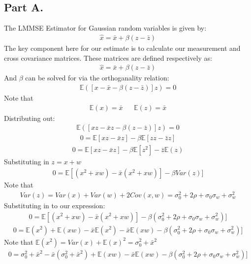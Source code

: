 \documentclass{article}
\begin{document}
\subsection*{Part A.}
The LMMSE Estimator for Gaussian random variables is given by:
\begin{align*}
\hat{x} = \bar{x} + \beta (z-\bar{z})
\end{align*}
The key component here for our estimate is to calculate our measurement and cross covariance matrices. These matrices are defined respectively as:
\begin{align*}
\hat{x} = \bar{x} + \beta (z-\bar{z})
\end{align*}
And $\beta$ can be solved for via the orthoganality relation:
\begin{align*}
\mathbb{E}([x-\bar{x} - \beta (z-\bar{z})]z)=0
\end{align*}
Note that 
\begin{align*}
\mathbb{E}(x) = \bar{x} && \mathbb{E}(z) = \bar{x}
\end{align*}
Distributing out:
\begin{align*}
\mathbb{E}([xz-\bar{x}z - \beta (z-\bar{z})]z)=0
\end{align*}
\begin{align*}
0=\mathbb{E}[xz-\bar{x}z] - \beta \mathbb{E}[z z-\bar{z}z]
\end{align*}
\begin{align*}
0=\mathbb{E}[xz-\bar{x}z] - \beta \mathbb{E}[z^2]- \bar{z}\mathbb{E}(z)
\end{align*}
Substituting in $z=x+w$
\begin{align*}
0=\mathbb{E}[(x^2+xw)-\bar{x}(x^2+xw)] - \beta Var(z)]
\end{align*}
Note that
\begin{align*}
Var(z) = Var(x)+Var(w)+2Cov(x,w)=\sigma^2_0+ 2\rho+\sigma_0\sigma_w + \sigma^2_w
\end{align*}
Substituting in to our expression:
\begin{align*}
0=\mathbb{E}[(x^2+xw)-\bar{x}(x^2+xw)] - \beta (\sigma^2_0+ 2\rho+\sigma_0\sigma_w + \sigma^2_w)]
\end{align*}
\begin{align*}
0=\mathbb{E}(x^2) + \mathbb{E}(xw)- \bar{x}\mathbb{E}(x^2) - \bar{x}\mathbb{E}(xw) - \beta (\sigma^2_0+ 2\rho+\sigma_0\sigma_w + \sigma^2_w)]
\end{align*}
Note that $\mathbb{E}(x^2) = Var(x)+\mathbb{E}(x)^2=\sigma_0^2+\bar{x}^2$
\begin{align*}
0=\sigma_0^2+\bar{x}^2 - \bar{x}(\sigma_0^2+\bar{x}^2) + \mathbb{E}(xw) - \bar{x}\mathbb{E}(xw) - \beta (\sigma^2_0+ 2\rho+\sigma_0\sigma_w + \sigma^2_w)]
\end{align*}
\end{document}
